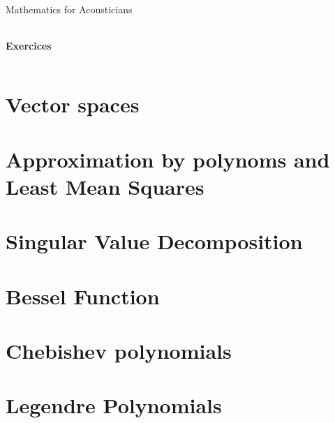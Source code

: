 \documentclass[10pt,a4paper]{report}
\begin{document}
\begin{center}
{\Large Mathematics for Acousticians}
 \begin{tabularx}{\linewidth}{c}
\hline
\end{tabularx}
\end{center}
\begin{center}
 {\Large \textbf{Exercices}\\}
\end{center}
 \begin{tabularx}{\linewidth}{c}
\hline
\end{tabularx}
\setcounter{chapter}{1}




\section{Vector spaces}












%
\section{Approximation by polynoms and Least Mean Squares}
%
%




%
%
\section{Singular Value Decomposition}


\section{Bessel Function}


\section{Chebishev polynomials}

\section{Legendre Polynomials}

\end{document}
